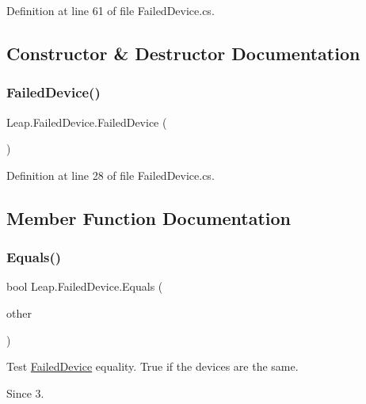 Definition at line 61 of file Failed\+Device.\+cs.



\subsection{Constructor \& Destructor Documentation}
\mbox{\label{class_leap_1_1_failed_device_a398ef7c331011c70c192ec349841d881}} 
\subsubsection{\texorpdfstring{FailedDevice()}{FailedDevice()}}
{\footnotesize\ttfamily Leap.\+Failed\+Device.\+Failed\+Device (\begin{DoxyParamCaption}{ }\end{DoxyParamCaption})}



Definition at line 28 of file Failed\+Device.\+cs.



\subsection{Member Function Documentation}
\mbox{\label{class_leap_1_1_failed_device_aca8825e6fb28beea78f313647bc9556f}} 
\subsubsection{\texorpdfstring{Equals()}{Equals()}}
{\footnotesize\ttfamily bool Leap.\+Failed\+Device.\+Equals (\begin{DoxyParamCaption}\item[{\mbox{\hyperlink{class_leap_1_1_failed_device}{Failed\+Device}}}]{other }\end{DoxyParamCaption})}



Test \mbox{\hyperlink{class_leap_1_1_failed_device}{Failed\+Device}} equality. True if the devices are the same. 

\begin{DoxySince}{Since}
3. 
\end{DoxySince}


